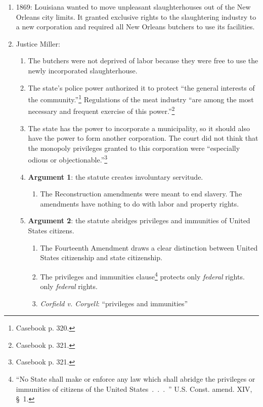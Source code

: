 \begin{enumerate}
    \item 1869: Louisiana wanted to move unpleasant slaughterhouses out of the 
    New Orleans city limits. It granted exclusive rights to the slaughtering 
    industry to a new corporation and required all New Orleans butchers to use 
    its facilities. 
    \item Justice Miller:
    \begin{enumerate}
        \item The butchers were not deprived of labor because they were free 
        to use the newly incorporated slaughterhouse.
        \item The state's police power authorized it to protect ``the general 
        interests of the community.''\footnote{Casebook p. 320.} Regulations of 
        the meat industry ``are among the most necessary and frequent exercise 
        of this power.''\footnote{Casebook p. 321.}
        \item The state has the power to incorporate a municipality, so it 
        should also have the power to form another corporation. The court did 
        not think that the monopoly privileges granted to this corporation 
        were ``especially odious or objectionable.''\footnote{Casebook p. 321.}
        \item \textbf{Argument 1}: the statute creates involuntary servitude.
        \begin{enumerate}
            \item The Reconstruction amendments were meant to end slavery. 
            The amendments have nothing to do with labor and property rights.
        \end{enumerate}
        \item \textbf{Argument 2}: the statute abridges privileges and 
        immunities of United States citizens.
        \begin{enumerate}
            \item The Fourteenth Amendment draws a clear distinction between 
            United States citizenship and state citizenship.
            \item The privileges and immunities clause\footnote{``No State 
            shall make or enforce any law which shall abridge the privileges 
            or immunities of citizens of the United States~.~.~.~'' U.S. 
            Const. amend. XIV, \S\ 1.} protects only \emph{federal} rights.
            only \emph{federal} rights.
            \item \emph{Corfield v. Coryell}: ``privileges and immunities'' 

\end{enumerate}
\end{enumerate}
\end{enumerate}

